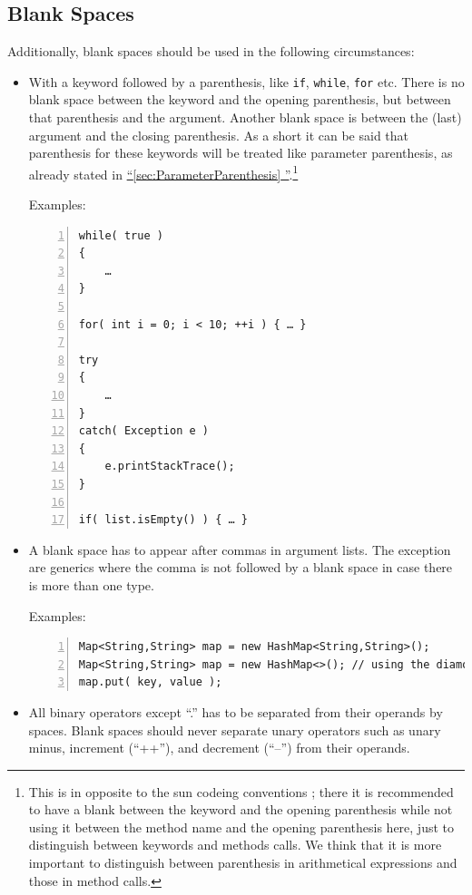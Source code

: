 \documentclass[12pt,a4paper,titlepage, parskip=half, headsepline, footsepline, cleardoubleplain]{scrbook}
\newcommand*{\tqfullref}[1]{\hyperref[{#1}]{“\ref*{#1} \nameref*{#1}”}}
\begin{document}
\subsection{Blank Spaces}\label{sec:BlankSpaces}
Additionally, blank spaces should be used in the following circumstances:
\begin{itemize}
\item{With a keyword followed by a parenthesis, like \lstinline|if|, \lstinline|while|, \lstinline|for| etc. There is no blank space between the keyword and the opening parenthesis, but  between that parenthesis and the argument. Another blank space is between the (last) argument and the closing parenthesis. As a short it can be said that parenthesis for these keywords will be treated like parameter parenthesis, as already stated in \tqfullref{sec:ParameterParenthesis}.\footnote{This is in opposite to the sun codeing conventions \autocite{SUN_CODE_CONVENTIONS}; there it is recommended to have a blank between the keyword and the opening parenthesis while not using it between the method name and the opening parenthesis here, just to distinguish between keywords and methods calls. We think that it is more important to distinguish between parenthesis in arithmetical expressions and those in method calls.}

Examples:
\begin{lstlisting}[numbers=left]
while( true )
{
    …
}

for( int i = 0; i < 10; ++i ) { … }

try
{
    …
}
catch( Exception e )
{
    e.printStackTrace();
}

if( list.isEmpty() ) { … }
\end{lstlisting}}
\item{A blank space has to appear after commas in argument lists. The exception are generics where the comma is not followed by a blank space in case there is more than one type.

Examples:
\begin{lstlisting}[numbers=left]
Map<String,String> map = new HashMap<String,String>();
Map<String,String> map = new HashMap<>(); // using the diamond operator
map.put( key, value );
\end{lstlisting}}
\item{All binary operators except “.” has to be separated from their operands by spaces. Blank spaces should never separate unary operators such as unary minus, increment (“++”), and decrement (“--”) from their operands.

}
\end{itemize}
\end{document}
